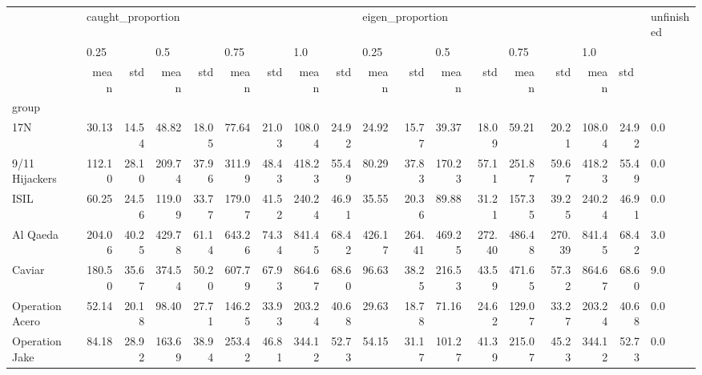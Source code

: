 \begin{tabular}{lrrrrrrrrrrrrrrrrl}
\toprule
{} & \multicolumn{8}{l}{caught\_proportion} & \multicolumn{8}{l}{eigen\_proportion} & unfinished \\
{} & \multicolumn{2}{l}{0.25} & \multicolumn{2}{l}{0.5} & \multicolumn{2}{l}{0.75} & \multicolumn{2}{l}{1.0} & \multicolumn{2}{l}{0.25} & \multicolumn{2}{l}{0.5} & \multicolumn{2}{l}{0.75} & \multicolumn{3}{l}{1.0} \\
{} &              mean &    std &    mean &    std &    mean &    std &    mean &    std &             mean &     std &    mean &     std &    mean &     std &    mean & \multicolumn{2}{l}{std} \\
group                &                   &        &         &        &         &        &         &        &                  &         &         &         &         &         &         &        &            \\
\midrule
17N                  &             30.13 &  14.54 &   48.82 &  18.05 &   77.64 &  21.03 &  108.04 &  24.92 &            24.92 &   15.77 &   39.37 &   18.09 &   59.21 &   20.21 &  108.04 &  24.92 &        0.0 \\
9/11 Hijackers       &            112.10 &  28.10 &  209.74 &  37.96 &  311.99 &  48.43 &  418.23 &  55.49 &            80.29 &   37.83 &  170.23 &   57.11 &  251.87 &   59.67 &  418.23 &  55.49 &        0.0 \\
ISIL                 &             60.25 &  24.56 &  119.09 &  33.77 &  179.07 &  41.52 &  240.24 &  46.91 &            35.55 &   20.36 &   89.88 &   31.21 &  157.35 &   39.25 &  240.24 &  46.91 &        0.0 \\
Al Qaeda             &            204.06 &  40.25 &  429.78 &  61.14 &  643.26 &  74.34 &  841.45 &  68.42 &           426.17 &  264.41 &  469.25 &  272.40 &  486.48 &  270.39 &  841.45 &  68.42 &        3.0 \\
Caviar               &            180.50 &  35.67 &  374.54 &  50.20 &  607.79 &  67.93 &  864.67 &  68.60 &            96.63 &   38.25 &  216.53 &   43.59 &  471.65 &   57.32 &  864.67 &  68.60 &        9.0 \\
Operation Acero      &             52.14 &  20.18 &   98.40 &  27.71 &  146.25 &  33.93 &  203.24 &  40.68 &            29.63 &   18.78 &   71.16 &   24.62 &  129.07 &   33.27 &  203.24 &  40.68 &        0.0 \\
Operation Jake       &             84.18 &  28.92 &  163.69 &  38.94 &  253.42 &  46.81 &  344.12 &  52.73 &            54.15 &   31.17 &  101.27 &   41.39 &  215.07 &   45.23 &  344.12 &  52.73 &        0.0 \\

\end{tabular}
